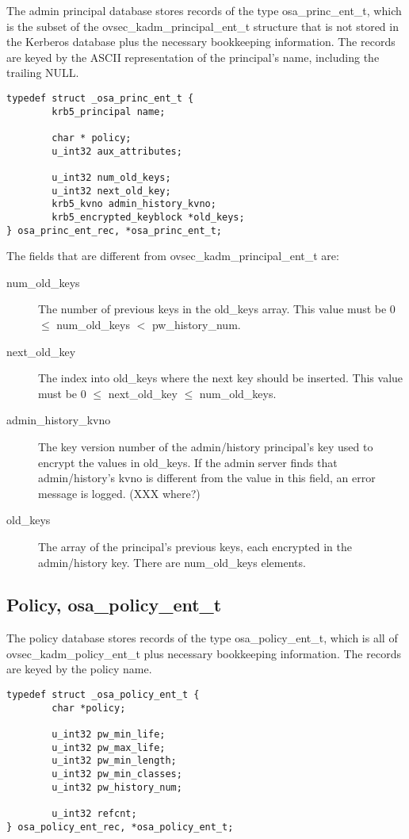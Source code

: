 The admin principal database stores records of the type
osa_princ_ent_t, which is the subset of the ovsec_kadm_principal_ent_t
structure that is not stored in the Kerberos database plus the
necessary bookkeeping information.  The records are keyed by the ASCII
representation of the principal's name, including the trailing NULL.

\begin{verbatim}
typedef struct _osa_princ_ent_t {
        krb5_principal name;

        char * policy;
        u_int32 aux_attributes;

        u_int32 num_old_keys;
        u_int32 next_old_key;
        krb5_kvno admin_history_kvno;
        krb5_encrypted_keyblock *old_keys;
} osa_princ_ent_rec, *osa_princ_ent_t;
\end{verbatim}

The fields that are different from ovsec_kadm_principal_ent_t are:

\begin{description}
\item[num_old_keys] The number of previous keys in the old_keys array.
This value must be 0 $\le$ num_old_keys $<$ pw_history_num.

\item[next_old_key] The index into old_keys where the next key should
be inserted.  This value must be 0 $\le$ next_old_key $\le$
num_old_keys.

\item[admin_history_kvno] The key version number of the admin/history
principal's key used to encrypt the values in old_keys.  If the admin
server finds that admin/history's kvno is different from the value in
this field, an error message is logged.  (XXX where?)

\item[old_keys] The array of the principal's previous keys, each
encrypted in the admin/history key.  There are num_old_keys elements.
\end{description}

\subsection{Policy, osa_policy_ent_t}

The policy database stores records of the type osa_policy_ent_t, which
is all of ovsec_kadm_policy_ent_t plus necessary bookkeeping
information.  The records are keyed by the policy name.

\begin{verbatim}
typedef struct _osa_policy_ent_t {
        char *policy;

        u_int32 pw_min_life;
        u_int32 pw_max_life;
        u_int32 pw_min_length;
        u_int32 pw_min_classes;
        u_int32 pw_history_num;

        u_int32 refcnt;
} osa_policy_ent_rec, *osa_policy_ent_t;
\end{verbatim}


